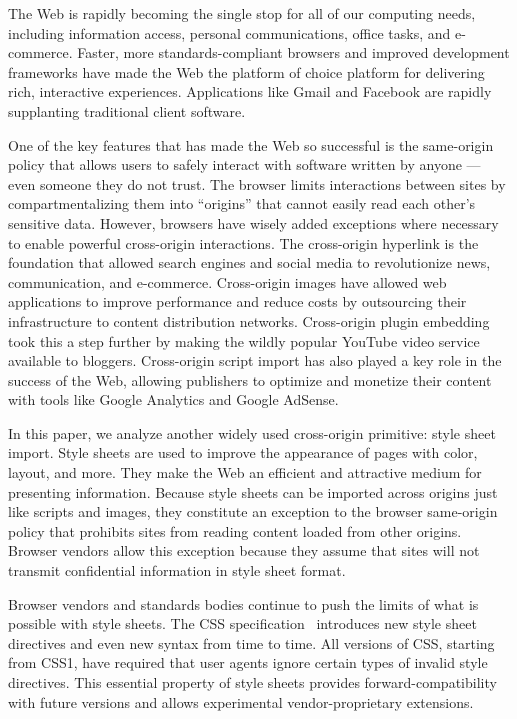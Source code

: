 \documentclass{acm_proc_article-sp}
\begin{document}
The Web is rapidly becoming the single stop for all of our computing needs,
including information access, personal communications, office tasks, and
e-commerce. Faster, more standards-compliant browsers and improved development
frameworks have made the Web the platform of choice platform for delivering
rich, interactive experiences. Applications like Gmail and Facebook are
rapidly supplanting traditional client software.

One of the key features that has made the Web so successful is the same-origin
policy that allows users to safely interact with software written by anyone
--- even someone they do not trust. The browser limits interactions between
sites by compartmentalizing them into ``origins'' that cannot easily read
each other's sensitive data. However, browsers have wisely added exceptions
where necessary to enable powerful cross-origin interactions. The cross-origin
hyperlink is the foundation that allowed search engines and social media to
revolutionize news, communication, and e-commerce. Cross-origin images have
allowed web applications to improve performance and reduce costs by
outsourcing their infrastructure to content distribution networks.
Cross-origin plugin embedding took this a step further by making the wildly
popular YouTube video service available to bloggers. Cross-origin script
import has also played a key role in the success of the Web, allowing
publishers to optimize and monetize their content with tools like Google
Analytics and Google AdSense.

In this paper, we analyze another widely used cross-origin primitive: style
sheet import. Style sheets are used to improve the appearance of pages with
color, layout, and more. They make the Web an efficient and attractive medium
for presenting information. Because style sheets can be imported across
origins just like scripts and images, they constitute an exception to the
browser same-origin policy that prohibits sites from reading content loaded
from other origins. Browser vendors allow this exception because they assume
that sites will not transmit confidential information in style sheet format.

Browser vendors and standards bodies continue to push the limits of what is
possible with style sheets. The CSS specification~\cite{cssspec} introduces
new style sheet directives and even new syntax from time to time. All versions
of CSS, starting from CSS1, have required that user agents ignore certain
types of invalid style directives. This essential property of style sheets
provides forward-compatibility with future versions and allows experimental
vendor-proprietary extensions.
\end{document}
